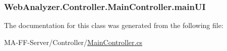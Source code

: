 \subsubsection[{main\+U\+I}]{ Web\+Analyzer.\+Controller.\+Main\+Controller.\+main\+U\+I\hspace{0.3cm}{\ttfamily [private]}}\label{class_web_analyzer_1_1_controller_1_1_main_controller_a70cf415b6537ad91455f3b9b450df036}


The documentation for this class was generated from the following file\+:\begin{DoxyCompactItemize}
\item 
M\+A-\/\+F\+F-\/\+Server/\+Controller/\hyperlink{_main_controller_8cs}{Main\+Controller.\+cs}\end{DoxyCompactItemize}
